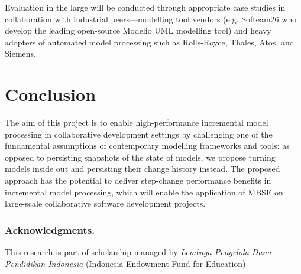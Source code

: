 \documentclass{llncs}
\begin{document}
Evaluation in the large will be conducted through appropriate case studies in collaboration with industrial peers---modelling tool vendors (e.g. Softeam26 who develop the leading open-source Modelio UML modelling tool) and heavy adopters of automated model processing such as Rolls-Royce, Thales, Atos, and Siemens.

\section{Conclusion}
The aim of this project is to enable high-performance incremental model processing in collaborative development settings by challenging one of the fundamental assumptions of contemporary modelling frameworks and tools: as opposed to persisting snapshots of the state of models, we propose turning models inside out and persisting their change history instead. The proposed approach has the potential to deliver step-change performance beneﬁts in incremental model processing, which will enable the application of MBSE on large-scale collaborative software development projects.

\subsubsection*{Acknowledgments.} This research is part of scholarship managed by \emph{Lembaga Pengelola Dana Pendidikan Indonesia} (Indonesia Endowment Fund for Education)

 

\end{document}
